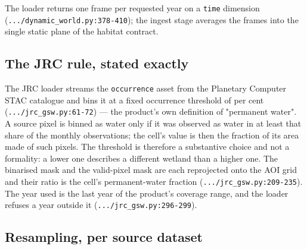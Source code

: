\documentclass[11pt,a4paper]{article}
\newcommand{\code}[1]{\texttt{#1}}
\begin{document}
The loader returns one frame per requested year on a \code{time} dimension
(\code{.../dynamic\_world.py:378-410}); the ingest stage averages the frames
into the single static plane of the habitat contract.

\subsection{The JRC rule, stated exactly}

The JRC loader streams the \code{occurrence} asset from the Planetary
Computer STAC catalogue and bins it at a fixed occurrence threshold of
 per cent
(\code{.../jrc\_gsw.py:61-72}) --- the product's own definition of
"permanent water". A source pixel is binned as water only if it was
observed as water in at least that share of the monthly observations; the
cell's value is then the fraction of its area made of such pixels. The
threshold is therefore a substantive choice and not a formality: a lower one
describes a different wetland than a higher one. The binarised mask and the valid-pixel mask are each
reprojected onto the AOI grid and their ratio is the cell's permanent-water
fraction (\code{.../jrc\_gsw.py:209-235}). The year used is the last year of
the product's coverage range, and the loader refuses a year outside it
(\code{.../jrc\_gsw.py:296-299}).

\subsection{Resampling, per source dataset}
\end{document}
